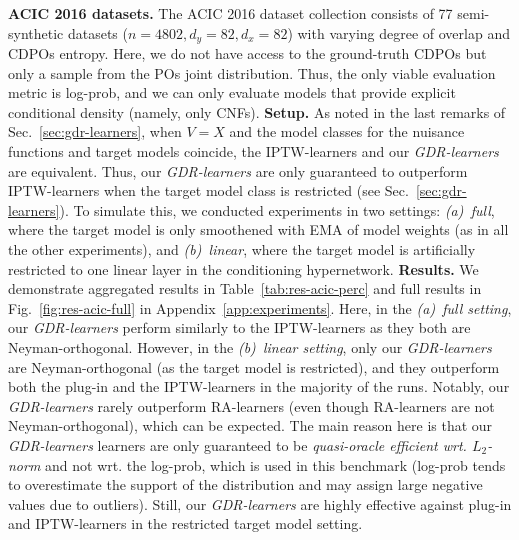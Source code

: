 \documentclass[dvipsnames]{article} %
\newcommand{\GDRlearners}{\emph{GDR-learners}\xspace}
\newcommand{\CDPOs}{CDPOs\xspace}
\begin{document}
\textbf{ACIC 2016 datasets.} The ACIC 2016 dataset collection  \citep{dorie2019automated} consists of 77 semi-synthetic datasets ($n = 4802, d_y=82, d_x=82$) with varying degree of overlap and \CDPOs entropy. Here, we do not have access to the ground-truth \CDPOs but only a sample from the POs joint distribution. Thus, the only viable evaluation metric is log-prob, and we can only evaluate models that provide explicit conditional density (namely, only CNFs). \textbf{Setup.}  As noted in the last remarks of Sec.~\ref{sec:gdr-learners}, when $V = X$ and the model classes for the nuisance functions and target models coincide, the IPTW-learners and our \GDRlearners are equivalent. Thus, our \GDRlearners are only guaranteed to outperform IPTW-learners when the target model class is restricted (see Sec.~\ref{sec:gdr-learners}). To simulate this, we conducted experiments in two settings: \emph{(a)~full}, where the target model is only smoothened with EMA of model weights (as in all the other experiments), and \emph{(b)~linear}, where the target model is artificially restricted to one linear layer in the conditioning hypernetwork. \textbf{Results.} We demonstrate aggregated results in Table~\ref{tab:res-acic-perc} and full results in Fig.~\ref{fig:res-acic-full} in Appendix~\ref{app:experiments}. Here, in the \emph{(a)~full setting}, our \GDRlearners perform similarly to the IPTW-learners as they both are Neyman-orthogonal. However, in the \emph{(b)~linear setting}, only our \GDRlearners are Neyman-orthogonal (as the target model is restricted), and they outperform both the plug-in and the IPTW-learners in the majority of the runs. Notably, our \GDRlearners rarely outperform RA-learners (even though RA-learners are not Neyman-orthogonal), which can be expected. The main reason here is that our \GDRlearners learners are only guaranteed to be \emph{quasi-oracle efficient wrt. $L_2$-norm} and not wrt. the log-prob, which is used in this benchmark (log-prob tends to overestimate the support of the distribution and may assign large negative values due to outliers). Still, our \GDRlearners are highly effective against plug-in and IPTW-learners in the restricted target model setting.            


\end{document}
